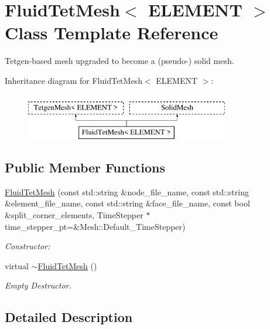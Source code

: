 \hypertarget{classFluidTetMesh}{}\section{Fluid\+Tet\+Mesh$<$ E\+L\+E\+M\+E\+NT $>$ Class Template Reference}
\label{classFluidTetMesh}


Tetgen-\/based mesh upgraded to become a (pseudo-\/) solid mesh.  


Inheritance diagram for Fluid\+Tet\+Mesh$<$ E\+L\+E\+M\+E\+NT $>$\+:\begin{figure}[H]
\begin{center}
\leavevmode
\includegraphics[height=2.000000cm]{classFluidTetMesh}
\end{center}
\end{figure}
\subsection*{Public Member Functions}
\begin{DoxyCompactItemize}
\item 
\hyperlink{classFluidTetMesh_a5f8ea145d68623198abc97209a0491a6}{Fluid\+Tet\+Mesh} (const std\+::string \&node\+\_\+file\+\_\+name, const std\+::string \&element\+\_\+file\+\_\+name, const std\+::string \&face\+\_\+file\+\_\+name, const bool \&split\+\_\+corner\+\_\+elements, Time\+Stepper $\ast$time\+\_\+stepper\+\_\+pt=\&Mesh\+::\+Default\+\_\+\+Time\+Stepper)
\begin{DoxyCompactList}\small\item\em Constructor\+: \end{DoxyCompactList}\item 
virtual \hyperlink{classFluidTetMesh_ae3f6cdb8d95cfe46c8f1fc15dd438b42}{$\sim$\+Fluid\+Tet\+Mesh} ()
\begin{DoxyCompactList}\small\item\em Empty Destructor. \end{DoxyCompactList}\end{DoxyCompactItemize}


\subsection{Detailed Description}

